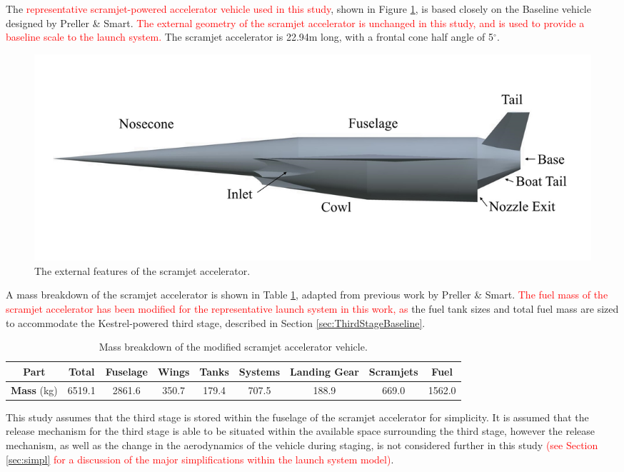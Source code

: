 		The \textcolor{red}{representative scramjet-powered accelerator vehicle used in this study}, shown in Figure \ref{fig:SPARTANlabelled}, is based closely on the Baseline vehicle designed by Preller \& Smart\cite{Preller2017b}. \textcolor{red}{The external geometry of the scramjet accelerator is unchanged in this study, and is used to provide a baseline scale to the launch system.} The scramjet accelerator is 22.94m long, with a frontal cone half angle of 5$^\circ$\cite{Preller2017b}. 
		\begin{figure}[ht]
			\centering
			\includegraphics[width=0.85\linewidth]{figures/3_vehicle_design/SPARTANlabelled}
			\caption{The external features of the scramjet accelerator.}
			\label{fig:SPARTANlabelled}
		\end{figure}
		A mass breakdown of the scramjet accelerator is shown in Table \ref{tab:MassBreakdown}, adapted from previous work by Preller \& Smart\cite{Preller2017b}. \textcolor{red}{The fuel mass of the scramjet accelerator has been modified for the representative launch system in this work, as} the fuel tank sizes and total fuel mass are sized to accommodate the Kestrel-powered third stage, described in Section \ref{sec:ThirdStageBaseline}.
		\begin{table}[h]
		\begin{tabular}{|c|c|c|c|c|c|c|c|c|}
			\hline  \textbf{Part} & Total & Fuselage & Wings & Tanks & Systems & Landing Gear & Scramjets & Fuel \\ 
			\hline \textbf{Mass} (kg) & 6519.1 & 2861.6 & 350.7 & 179.4 & 707.5 & 188.9 & 669.0 & 1562.0 \\ 
			\hline 
		\end{tabular} 
		\caption{Mass breakdown of the modified scramjet accelerator vehicle.}
		\label{tab:MassBreakdown}
		\end{table}
This study assumes that the third stage is stored within the fuselage of the scramjet accelerator for simplicity. It is assumed that the release mechanism for the third stage is able to be situated within the available space surrounding the third stage, however the release mechanism, as well as the change in the aerodynamics of the vehicle during staging,  is not considered further in this study \textcolor{red}{(see Section \ref{sec:simpl} for a discussion of the major simplifications within the launch system model)}. %
		

